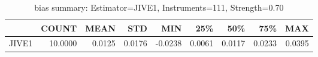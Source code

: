 \begin{table}[ht]
\centering
\caption{bias summary: Estimator=JIVE1, Instruments=111, Strength=0.70}
\begin{tabular}{lrrrrrrrr}
\toprule
 & COUNT & MEAN & STD & MIN & 25\% & 50\% & 75\% & MAX \\
\midrule
JIVE1 & 10.0000 & 0.0125 & 0.0176 & -0.0238 & 0.0061 & 0.0117 & 0.0233 & 0.0395 \\
\bottomrule
\end{tabular}
\end{table}
